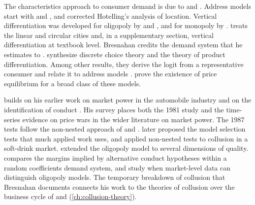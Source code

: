 The characteristics approach to consumer demand is due to \citet{Lancaster1966} and \citet{Gorman1980}. Address models
start with \citet{Hotelling1929} and \citet{Salop1979}, and \citet{DAspremontGabszewiczThisse1979} corrected
Hotelling's analysis of location. Vertical differentiation was developed for oligopoly by \citet{GabszewiczThisse1979}
and \citet{ShakedSutton1982,ShakedSutton1983}, and for monopoly by \citet{MussaRosen1978}. \citet[ch.~7]{Tirole1988}
treats the linear and circular cities and, in a supplementary section, vertical differentiation at textbook
level. Bresnahan credits the demand
system that he estimates to \citet{PrescottVisscher1977}. \citet{AndersonDePalmaThisse1992} synthesize discrete choice
theory and the theory of product differentiation. Among other results, they derive the logit from a representative
consumer \citep{AndersonDePalmaThisse1988} and relate it to address models \citep{AndersonDePalmaThisse1989}.
\citet{CaplinNalebuff1991} prove the existence of price equilibrium for a broad class of these models.

\citet{Bresnahan1987} builds on his earlier work on market power in the automobile industry and on the
identification of conduct \citep{Bresnahan1981,Bresnahan1982}. His survey \citep{Bresnahan1989} places both the 1981
study and the time-series evidence on price wars in the wider literature on market power. The 1987 tests follow
the non-nested approach of
\citet{Cox1961} and \citet{PesaranDeaton1978}. \citet{Vuong1989} later proposed the model selection tests that much
applied work uses, and \citet{GasmiLaffontVuong1992} applied non-nested tests to collusion in a soft-drink market.
\citet{FeenstraLevinsohn1995} extended the oligopoly model to several dimensions of quality. \citet{Nevo2001} compares
the margins implied by alternative conduct hypotheses within a random coefficients demand system, and
\citet{BerryHaile2014} study when market-level data can distinguish oligopoly models. The temporary breakdown of
collusion that Bresnahan documents connects his work to the theories of collusion over the business cycle of
\citet{RotembergSaloner1986} and \citet{GreenPorter1984} (\cref{ch:collusion-theory}).

